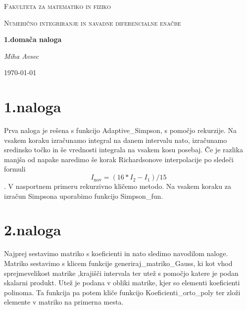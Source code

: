 \documentclass[11pt]{article} %
\begin{document}
\begin{titlepage}
\centering
{\scshape\LARGE Fakulteta za matematiko in fiziko \par}
\vspace{1cm}
{\scshape\Large Numerično integriranje in navadne diferencialne enačbe\par}
\vspace{1.5cm}
{\huge\bfseries 1.domača naloga\par}
\vspace{2cm}
{\Large\itshape Miha Avsec\par}
\vfill

\vfill

{\large \today\par}
\end{titlepage}


\section{1.naloga}

Prva naloga je rešena s funkcijo Adaptive\_Simpson, s pomočjo rekurzije. Na vsakem koraku izračunamo integral na danem intervalu nato, izračunamo sredinsko točko in še vrednosti integrala na vsakem kosu posebaj. Če je razlika manjša od napake naredimo še korak Richardsonove interpolacije po sledeči formuli
$$I_{\text{nov}} = (16*I_2-I_1)/15$$.
V nasportnem primeru rekurzivno kličemo metodo. Na vsakem koraku za izračun Simpsona uporabimo funkcijo Simpson\_fun.

\section{2.naloga}
Najprej sestavimo matriko s koeficienti in nato sledimo navodilom naloge. Matriko sestavimo s klicem funkcije generiraj\_matriko\_Gauss, ki kot vhod sprejmevelikost matrike ,krajišči intervala ter utež s pomočjo katere je podan skalarni produkt. Utež je podana v obliki matrike, kjer so elementi koeficienti polinoma. Ta funkcija pa potem kliče funkcijo Koeficienti\_orto\_poly ter zloži elemente v matriko na primerna mesta.
\end{document}
